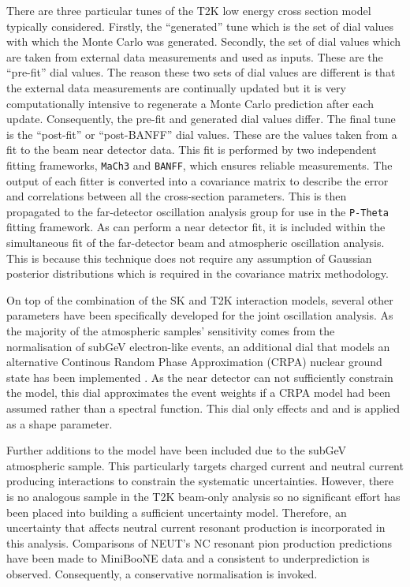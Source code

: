 There are three particular tunes of the T2K low energy cross section model typically considered. Firstly, the ``generated'' tune which is the set of dial values with which the Monte Carlo was generated. Secondly, the set of dial values which are taken from external data measurements and used as inputs. These are the ``pre-fit'' dial values. The reason these two sets of dial values are different is that the external data measurements are continually updated but it is very computationally intensive to regenerate a Monte Carlo prediction after each update. Consequently, the pre-fit and generated dial values differ. The final tune is the ``post-fit'' or ``post-BANFF'' dial values. These are the values taken from a fit to the beam near detector data. This fit is performed by two independent fitting frameworks, \texttt{MaCh3} and \texttt{BANFF}, which ensures reliable measurements. The output of each fitter is converted into a covariance matrix to describe the error and correlations between all the cross-section parameters. This is then propagated to the far-detector oscillation analysis group for use in the \texttt{P-Theta} fitting framework. As  can perform a near detector fit, it is included within the simultaneous fit of the far-detector beam and atmospheric oscillation analysis. This is because this technique does not require any assumption of Gaussian posterior distributions which is required in the covariance matrix methodology.

On top of the combination of the SK and T2K interaction models, several other parameters have been specifically developed for the joint oscillation analysis. As the majority of the atmospheric samples' \dcp sensitivity comes from the normalisation of subGeV electron-like events, an additional dial that models an alternative Continous Random Phase Approximation (CRPA) nuclear ground state has been implemented \cite{t2k_tn_422}. As the near detector can not sufficiently constrain the model, this dial approximates the event weights if a CRPA model had been assumed rather than a spectral function. This dial only effects  and  and is applied as a shape parameter.

Further additions to the model have been included due to the subGeV  atmospheric sample. This particularly targets charged current and neutral current  producing interactions to constrain the systematic uncertainties. However, there is no analogous sample in the T2K beam-only analysis so no significant effort has been placed into building a sufficient uncertainty model. Therefore, an uncertainty that affects neutral current resonant  production is incorporated in this analysis. Comparisons of NEUT's NC resonant pion production predictions have been made to MiniBooNE \cite{MB_NC1pi0} data and a consistent  to  underprediction is observed. Consequently, a conservative  normalisation is invoked. 


